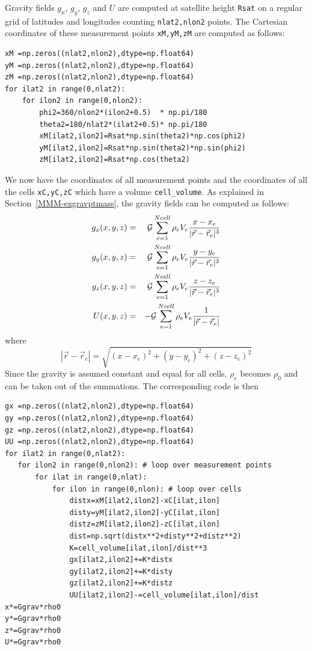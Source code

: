 Gravity fields $g_x$, $g_y$, $g_z$ and $U$ are computed at satellite height \lstinline{Rsat}
on a regular grid of latitudes and longitudes counting \lstinline{nlat2,nlon2} points. 
The Cartesian coordinates of these measurement points \lstinline{xM,yM,zM} 
are computed as follows:
\begin{lstlisting}
xM =np.zeros((nlat2,nlon2),dtype=np.float64)
yM =np.zeros((nlat2,nlon2),dtype=np.float64)
zM =np.zeros((nlat2,nlon2),dtype=np.float64)
for ilat2 in range(0,nlat2):
    for ilon2 in range(0,nlon2): 
        phi2=360/nlon2*(ilon2+0.5)  * np.pi/180
        theta2=180/nlat2*(ilat2+0.5)* np.pi/180
        xM[ilat2,ilon2]=Rsat*np.sin(theta2)*np.cos(phi2)
        yM[ilat2,ilon2]=Rsat*np.sin(theta2)*np.sin(phi2)
        zM[ilat2,ilon2]=Rsat*np.cos(theta2)
\end{lstlisting}
We now have the coordinates of all measurement points and the coordinates of all the 
cells \lstinline{xC,yC,zC} which have a volume \lstinline{cell_volume}.
As explained in Section~\ref{MMM-exgravptmass}, the gravity fields can be computed as 
follows:
\begin{eqnarray}
g_x(x,y,z) &=& {\cal G}  \sum_{e=1}^{Ncell} \rho_e V_e  \frac{x-x_e}{|\vec{r}-\vec{r}_e|^3} \label{eqq:gravdiscr1}\\
g_y(x,y,z) &=& {\cal G}  \sum_{e=1}^{Ncell} \rho_e V_e  \frac{y-y_e}{|\vec{r}-\vec{r}_e|^3} \label{eqq:gravdiscr2}\\
g_z(x,y,z) &=& {\cal G}  \sum_{e=1}^{Ncell} \rho_e V_e  \frac{z-z_e}{|\vec{r}-\vec{r}_e|^3} \label{eqq:gravdiscr3}\\
U(x,y,z)   &=& -{\cal G} \sum_{e=1}^{Ncell} \rho_e V_e  \frac{1}{|\vec{r}-\vec{r}_e|}       \label{eqq:gravdiscr4}
\end{eqnarray}
where 
\[
|\vec{r}-\vec{r}_e|=\sqrt{ (x-x_e)^2+(y-y_e)^2+(z-z_e)^2   }
\]
Since the gravity is assumed constant and equal for all cells, $\rho_e$ becomes $\rho_0$ and can be taken out of the 
summations.
The corresponding code is then 
\begin{lstlisting}
gx =np.zeros((nlat2,nlon2),dtype=np.float64)
gy =np.zeros((nlat2,nlon2),dtype=np.float64)
gz =np.zeros((nlat2,nlon2),dtype=np.float64)
UU =np.zeros((nlat2,nlon2),dtype=np.float64)
for ilat2 in range(0,nlat2):
   for ilon2 in range(0,nlon2): # loop over measurement points
       for ilat in range(0,nlat):
           for ilon in range(0,nlon): # loop over cells
               distx=xM[ilat2,ilon2]-xC[ilat,ilon]
               disty=yM[ilat2,ilon2]-yC[ilat,ilon]
               distz=zM[ilat2,ilon2]-zC[ilat,ilon]
               dist=np.sqrt(distx**2+disty**2+distz**2)
               K=cell_volume[ilat,ilon]/dist**3
               gx[ilat2,ilon2]+=K*distx
               gy[ilat2,ilon2]+=K*disty
               gz[ilat2,ilon2]+=K*distz
               UU[ilat2,ilon2]-=cell_volume[ilat,ilon]/dist
x*=Ggrav*rho0
y*=Ggrav*rho0
z*=Ggrav*rho0
U*=Ggrav*rho0
\end{lstlisting}
